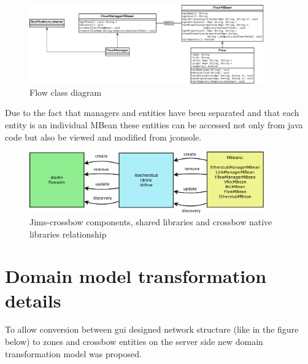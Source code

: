 \documentclass[11pt]{book}
\begin{document}
        \begin{figure}[H]
          \begin{center}
            \includegraphics[width=0.9\textwidth]{img/impl/flow.png}
          \end{center}
          \caption{Flow class diagram}
        \end{figure}        

      Due to the fact that managers and entities have been separated and that each entity is an individual MBean these
      entities can be accessed not only from java code but also be viewed and modified from jconsole.

      \begin{figure}[H]
        \begin{center}
          \includegraphics[width=0.9\textwidth]{img/impl/crossbowLibsDiagram.pdf}
        \end{center}
        \caption{Jims-crossbow components, shared libraries and crossbow native libraries relationship}
      \end{figure} 


    \section{Domain model transformation details}
    \label{sec:impl:model}

      To allow conversion between gui designed network structure (like in the figure below) to zones and crossbow
      entities on the server side new domain transformation model was proposed. 
      
\end{document}
